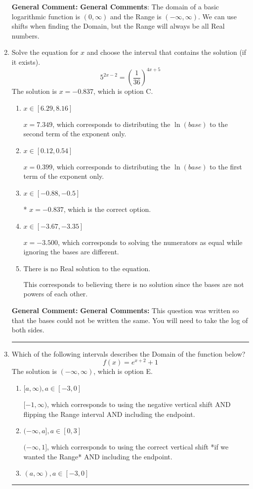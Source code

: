 \documentclass{extbook}[14pt]
\newcommand{\litem}[1]{\item #1

\rule{\textwidth}{0.4pt}}
\begin{document}
\begin{enumerate}
{\textbf{General Comment:} \textbf{General Comments}: The domain of a basic logarithmic function is $(0, \infty)$ and the Range is $(-\infty, \infty)$. We can use shifts when finding the Domain, but the Range will always be all Real numbers.
}
\litem{
Solve the equation for $x$ and choose the interval that contains the solution (if it exists).
\[ 5^{2x-2} = \left(\frac{1}{36}\right)^{4x+5} \]The solution is \( x = -0.837 \), which is option C.\begin{enumerate}[label=\Alph*.]
\item \( x \in [6.29, 8.16] \)

$x = 7.349$, which corresponds to distributing the $\ln(base)$ to the second term of the exponent only.
\item \( x \in [0.12, 0.54] \)

$x = 0.399$, which corresponds to distributing the $\ln(base)$ to the first term of the exponent only.
\item \( x \in [-0.88, -0.5] \)

* $x = -0.837$, which is the correct option.
\item \( x \in [-3.67, -3.35] \)

$x = -3.500$, which corresponds to solving the numerators as equal while ignoring the bases are different.
\item \( \text{There is no Real solution to the equation.} \)

This corresponds to believing there is no solution since the bases are not powers of each other.
\end{enumerate}

\textbf{General Comment:} \textbf{General Comments:} This question was written so that the bases could not be written the same. You will need to take the log of both sides.
}
\litem{
Which of the following intervals describes the Domain of the function below?
\[ f(x) = e^{x+2}+1 \]The solution is \( (-\infty, \infty) \), which is option E.\begin{enumerate}[label=\Alph*.]
\item \( [a, \infty), a \in [-3, 0] \)

$[-1, \infty)$, which corresponds to using the negative vertical shift AND flipping the Range interval AND including the endpoint.
\item \( (-\infty, a], a \in [0, 3] \)

$(-\infty, 1]$, which corresponds to using the correct vertical shift *if we wanted the Range* AND including the endpoint.
\item \( (a, \infty), a \in [-3, 0] \)


\end{enumerate}}
\end{enumerate}
\end{document}
